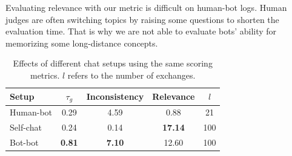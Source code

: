 Evaluating relevance with our metric
is difficult on human-bot logs. Human judges
are often switching topics by raising 
some questions to shorten the evaluation time.
That is why we are not able to evaluate bots'
ability for memorizing some long-distance concepts.
 
    
\begin{table}[ht!]
\centering
\small
\begin{tabular}{lcccc}
\toprule
Setup& $\tau_{g}$  & Inconsistency & Relevance &$l$   \\ \midrule
Human-bot& 0.29   &4.59& 0.88 &21   \\
Self-chat& 0.24  & 0.14 & \textbf{17.14} & 100\\
Bot-bot& \textbf{0.81}  & \textbf{7.10} & 12.60&100 \\
\bottomrule
\end{tabular}
\caption{
Effects of different chat setups using the same scoring metrics. 
$l$ refers to the number of exchanges.
}
\label{tab:frame}
\end{table} 

